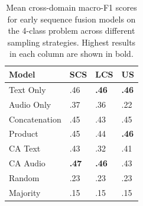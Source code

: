 \documentclass[twocolumn]{article}
\begin{document}
\begin{table}[h]
\centering
\caption{Mean cross-domain macro-F1 scores for early sequence fusion models on the 4-class problem across different sampling strategies. Highest results in each column are shown in bold.\label{tbl:results-cd-4class-sampling}}
\begin{tabular}{|l|lll|}
\hline
Model         & SCS          & LCS          & US           \\ \hline
Text Only     & .46          & \textbf{.46} & \textbf{.46}          \\
Audio Only    & .37          & .36          & .22          \\ \hline
Concatenation & .45          & .43          & .45          \\
Product       & .45          & .44          & \textbf{.46}          \\
CA Text       & .43          & .32          & .41          \\
CA Audio      & \textbf{.47} & \textbf{.46} & .43 \\ \hline
Random        & .23          & .23          & .23          \\
Majority      & .15          & .15          & .15          \\ \hline
\end{tabular}
\end{table}
\end{document}
